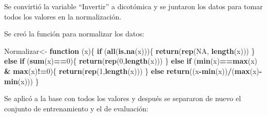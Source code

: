 \documentclass[]{article}
\newenvironment{Shaded}{\begin{snugshade}}{\end{snugshade}}
\newcommand{\KeywordTok}[1]{\textcolor[rgb]{0.13,0.29,0.53}{\textbf{#1}}}
\newcommand{\DecValTok}[1]{\textcolor[rgb]{0.00,0.00,0.81}{#1}}
\newcommand{\StringTok}[1]{\textcolor[rgb]{0.31,0.60,0.02}{#1}}
\newcommand{\OtherTok}[1]{\textcolor[rgb]{0.56,0.35,0.01}{#1}}
\newcommand{\ControlFlowTok}[1]{\textcolor[rgb]{0.13,0.29,0.53}{\textbf{#1}}}
\newcommand{\OperatorTok}[1]{\textcolor[rgb]{0.81,0.36,0.00}{\textbf{#1}}}
\newcommand{\NormalTok}[1]{#1}
\begin{document}
Se convirtió la variable ``Invertir'' a dicotómica y se juntaron los
datos para tomar todos los valores en la normalización.

\begin{Shaded}
\end{Shaded}

Se creó la función para normalizar los datos:

\begin{Shaded}
\begin{Highlighting}[]
\NormalTok{Normalizar<-}\StringTok{ }\ControlFlowTok{function}\NormalTok{ (x)\{}
  \ControlFlowTok{if}\NormalTok{ (}\KeywordTok{all}\NormalTok{(}\KeywordTok{is.na}\NormalTok{(x)))\{}
    \KeywordTok{return}\NormalTok{(}\KeywordTok{rep}\NormalTok{(}\OtherTok{NA}\NormalTok{, }\KeywordTok{length}\NormalTok{(x)))}
\NormalTok{  \} }\ControlFlowTok{else} \ControlFlowTok{if}\NormalTok{ (}\KeywordTok{sum}\NormalTok{(x)}\OperatorTok{==}\DecValTok{0}\NormalTok{)\{}
    \KeywordTok{return}\NormalTok{(}\KeywordTok{rep}\NormalTok{(}\DecValTok{0}\NormalTok{,}\KeywordTok{length}\NormalTok{(x)))}
\NormalTok{  \} }\ControlFlowTok{else} \ControlFlowTok{if}\NormalTok{ (}\KeywordTok{min}\NormalTok{(x)}\OperatorTok{==}\KeywordTok{max}\NormalTok{(x) }\OperatorTok{&}\StringTok{ }\KeywordTok{max}\NormalTok{(x)}\OperatorTok{!=}\DecValTok{0}\NormalTok{)\{}
    \KeywordTok{return}\NormalTok{(}\KeywordTok{rep}\NormalTok{(}\DecValTok{1}\NormalTok{,}\KeywordTok{length}\NormalTok{(x)))}
\NormalTok{  \} }\ControlFlowTok{else}
  \KeywordTok{return}\NormalTok{((x}\OperatorTok{-}\KeywordTok{min}\NormalTok{(x))}\OperatorTok{/}\NormalTok{(}\KeywordTok{max}\NormalTok{(x)}\OperatorTok{-}\KeywordTok{min}\NormalTok{(x)))}
\NormalTok{\} }
\end{Highlighting}
\end{Shaded}

Se aplicó a la base con todos los valores y después se separaron de
nuevo el conjunto de entrenamiento y el de evaluación:
\end{document}
